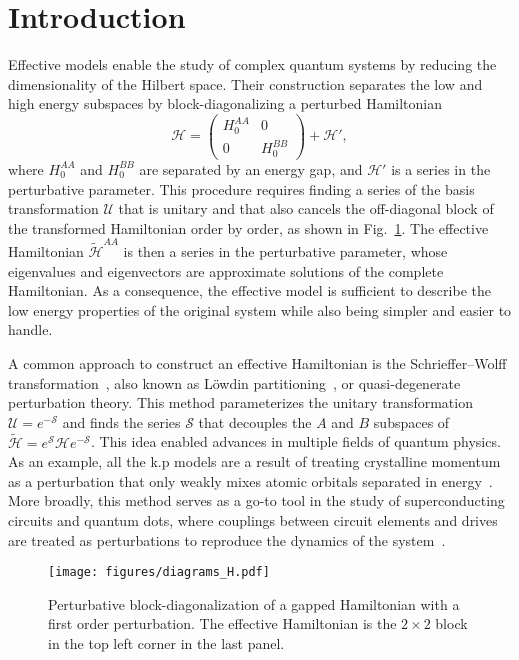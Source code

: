 \section{Introduction}

Effective models enable the study of complex quantum systems by reducing the dimensionality of the Hilbert space.
Their construction separates the low and high energy subspaces by block-diagonalizing a perturbed Hamiltonian
%
\begin{equation}
    \mathcal{H} = \begin{pmatrix}H_0^{AA} & 0 \\ 0 & H_0^{BB}\end{pmatrix} + \mathcal{H}',
\end{equation}
%
where $H_0^{AA}$ and $H_0^{BB}$ are separated by an energy gap, and $\mathcal{H}'$ is a series in the perturbative parameter.
This procedure requires finding a series of the basis transformation $\mathcal{U}$ that is unitary and that also cancels the off-diagonal block of the transformed Hamiltonian order by order, as shown in Fig.~\ref{fig:block_diagonalization}.
The effective Hamiltonian $\tilde{\mathcal{H}}^{AA}$ is then a series in the perturbative parameter, whose eigenvalues and eigenvectors are approximate solutions of the complete Hamiltonian.
As a consequence, the effective model is sufficient to describe the low energy properties of the original system while also being simpler and easier to handle.

A common approach to construct an effective Hamiltonian is the Schrieffer--Wolff transformation~\cite{Schrieffer_1966,Bravyi_2011}, also known as Löwdin partitioning~\cite{Lowdin_1962}, or quasi-degenerate perturbation theory.
This method parameterizes the unitary transformation $\mathcal{U} = e^{-\mathcal{S}}$ and finds the series $\mathcal{S}$ that decouples the $A$ and $B$ subspaces of $\tilde{\mathcal{H}} = e^{\mathcal{S}}\mathcal{H}e^{-\mathcal{S}}$.
This idea enabled advances in multiple fields of quantum physics.
As an example, all the k.p models are a result of treating crystalline momentum as a perturbation that only weakly mixes atomic orbitals separated in energy~\cite{Luttinger_1955}.
More broadly, this method serves as a go-to tool in the study of superconducting circuits and quantum dots, where couplings between circuit elements and drives are treated as perturbations to reproduce the dynamics of the system~\cite{Krantz_2019,Romhanyi_2015}.
%
\begin{figure}[h!]
    \centering
    \texttt{[image: figures/diagrams\_H.pdf]}
    \caption{
      Perturbative block-diagonalization of a gapped Hamiltonian with a first order
      perturbation.
      The effective Hamiltonian is the $2\times 2$ block in the top left corner in
      the last panel.
    }
    \label{fig:block_diagonalization}
\end{figure}

